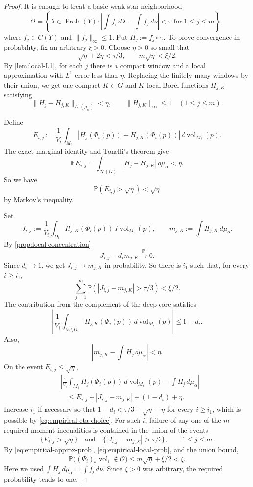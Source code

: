 \documentclass[12pt]{amsart}
\theoremstyle{definition}
\newcommand{\vol}{\operatorname{vol}}
\newcommand{\Prob}{\operatorname{Prob}}
\newcommand{\cN}{\mathcal N}
\newcommand{\cO}{\mathcal O}
\newcommand{\1}{\mathbf 1}
\newcommand{\dbar}{\overline{\vol}}
\begin{document}
\begin{proof}
It is enough to treat a basic weak-star neighborhood
\[
 \cO=\left\{\lambda\in\Prob(Y):
 \left|\int f_j\,d\lambda-\int f_j\,d\nu\right|<\tau
 \text{ for }1\leq j\leq m\right\},
\]
where $f_j\in C(Y)$ and $\|f_j\|_\infty\leq1$. Put $H_j:=f_j\circ\pi$. To prove convergence in probability, fix an
arbitrary $\xi>0$. Choose $\eta>0$ so small that
\begin{equation}\label{eq:empirical-eta-choice}
 \sqrt\eta+2\eta<\tau/3,
 \qquad m\sqrt\eta<\xi/2.
\end{equation}
By \cref{lem:local-L1}, for each $j$ there is a compact window and a local approximation with $L^1$ error less than $\eta$. Replacing the finitely many windows by their union, we get one compact $K\subset G$ and $K$-local Borel functions $H_{j,K}$ satisfying
\[
 \|H_j-H_{j,K}\|_{L^1(\mu_\alpha)}<\eta,
 \qquad \|H_{j,K}\|_\infty\leq1
 \quad(1\leq j\leq m).
\]

Define
\[
 E_{i,j}:=\frac1{V_i}\int_{M_i}
 |H_j(\Phi_i(p))-H_{j,K}(\Phi_i(p))|\,d\vol_{M_i}(p).
\]
The exact marginal identity and Tonelli's theorem give
\[
 \mathbb E E_{i,j}
 =\int_{\cN(G)}|H_j-H_{j,K}|\,d\mu_\alpha<\eta.
\]
So we have
\begin{equation}\label{eq:empirical-approx-prob}
 \mathbb P(E_{i,j}>\sqrt\eta)<\sqrt\eta
\end{equation}
by Markov's inequality.

Set
\[
 J_{i,j}:=\frac1{V_i}\int_{D_i}H_{j,K}(\Phi_i(p))\,d\vol_{M_i}(p),
 \qquad m_{j,K}:=\int H_{j,K}\,d\mu_\alpha.
\]
By \cref{prop:local-concentration},
\[
 J_{i,j}-d_i m_{j,K}\xrightarrow{\mathbb P}0.
\]
Since $d_i\to1$, we get $J_{i,j}\to m_{j,K}$ in probability.
So there is $i_1$ such that, for every $i\geq i_1$,
\begin{equation}\label{eq:empirical-local-prob}
 \sum_{j=1}^m
 \mathbb P\left(|J_{i,j}-m_{j,K}|>\tau/3\right)<\xi/2.
\end{equation}
The contribution from the complement of the deep core satisfies
\[
 \left|\frac1{V_i}\int_{M_i\setminus D_i}
 H_{j,K}(\Phi_i(p))\,d\vol_{M_i}(p)\right|
 \leq1-d_i.
\]
Also,
\[
 |m_{j,K}-\int H_j\,d\mu_\alpha|<\eta.
\]
On the event $E_{i,j}\leq\sqrt\eta$,
\begin{align*}
 &\left|\frac1{V_i}\int_{M_i}H_j(\Phi_i(p))\,d\vol_{M_i}(p)
 -\int H_j\,d\mu_\alpha\right|\\
 &\quad\leq E_{i,j}+|J_{i,j}-m_{j,K}|+(1-d_i)+\eta.
\end{align*}
Increase $i_1$ if necessary so that
$1-d_i<\tau/3-\sqrt\eta-\eta$ for every $i\geq i_1$, which is possible by
\eqref{eq:empirical-eta-choice}. For such $i$, failure of any one of the $m$
required moment inequalities is contained in the union of the events
\[
 \{E_{i,j}>\sqrt\eta\}
 \quad\text{and}\quad
 \{|J_{i,j}-m_{j,K}|>\tau/3\},
 \qquad 1\leq j\leq m.
\]
By \eqref{eq:empirical-approx-prob},
\eqref{eq:empirical-local-prob}, and the union bound,
\[
 \mathbb P\bigl((\Psi_i)_*\dbar_i\notin\cO\bigr)
 \leq m\sqrt\eta+\xi/2<\xi.
\]
Here we used $\int H_j\,d\mu_\alpha=\int f_j\,d\nu$. Since $\xi>0$ was
arbitrary, the required probability tends to one.
\end{proof}
\end{document}
